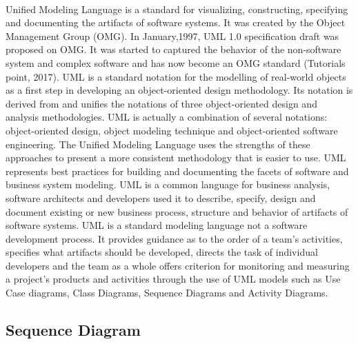 \documentclass[12pt]{article}
\begin{document}
\paragraph*{}
Unified Modeling Language is a standard for visualizing, constructing, specifying and documenting the artifacts of software systems. It was created by the Object Management Group (OMG). In January,1997, UML 1.0 specification draft was proposed on OMG. It was started to captured the behavior of the non-software system and complex software and has now become an OMG standard (Tutorials point, 2017). 
UML is a standard notation for the modelling of real-world objects as a first step in developing an object-oriented design methodology. Its notation is derived from and unifies the notations of three object-oriented design and analysis methodologies. UML is actually a combination of several notations: object-oriented design, object modeling technique and object-oriented software engineering. The Unified Modeling Language uses the strengths of these approaches to present a more consistent methodology that is easier to use. UML represents best practices for building and documenting the facets of software and business system modeling. UML is a common language for business analysis, software architects and developers used it to describe, specify, design and document existing or new business process, structure and behavior of artifacts of software systems. UML is a standard modeling language not a software development process. It provides guidance as to the order of a team’s activities, specifies what artifacts should be developed, directs the task of individual developers and the team as a whole offers criterion for monitoring and measuring a project’s products and activities through the use of UML models such as Use Case diagrams, Class Diagrams, Sequence Diagrams and Activity Diagrams.
\subsection*{Sequence Diagram}
\end{document}
